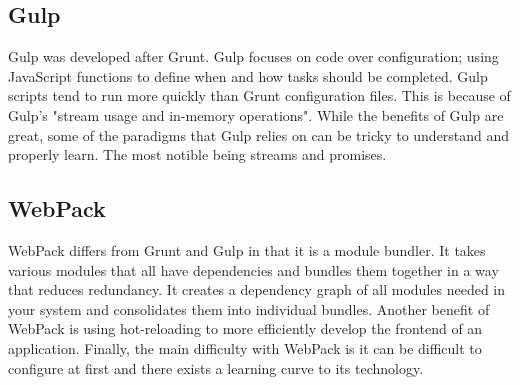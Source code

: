 \documentclass[draftclsnofoot,onecolumn,letterpaper,10pt,compsoc]{IEEEtran}
\begin{document}
	\subsection{Gulp}
        Gulp was developed after Grunt. Gulp focuses on code over configuration\cite{TaskRunners}; using JavaScript functions to define when and how tasks should be completed. 
        Gulp scripts tend to run more quickly than Grunt configuration files\cite{GulpGruntSpeed}. 
        This is because of Gulp's "stream usage and in-memory operations"\cite{TaskRunners}. 
        While the benefits of Gulp are great, some of the paradigms that Gulp relies on can be tricky to understand and properly learn. 
        The most notible being streams and promises\cite{TaskRunners}.
    
	\subsection{WebPack}
        WebPack differs from Grunt and Gulp in that it is a module bundler. 
        It takes various modules that all have dependencies and bundles them together in a way that reduces redundancy\cite{WebPack}. 
        It creates a dependency graph of all modules needed in your system and consolidates them into individual bundles\cite{WebPack}.
        Another benefit of WebPack is using hot-reloading to more efficiently develop the frontend of an application\cite{TaskRunners}.
        Finally, the main difficulty with WebPack is it can be difficult to configure at first and there exists a learning curve to its technology\cite{TaskRunners}.

{}

\end{document}
